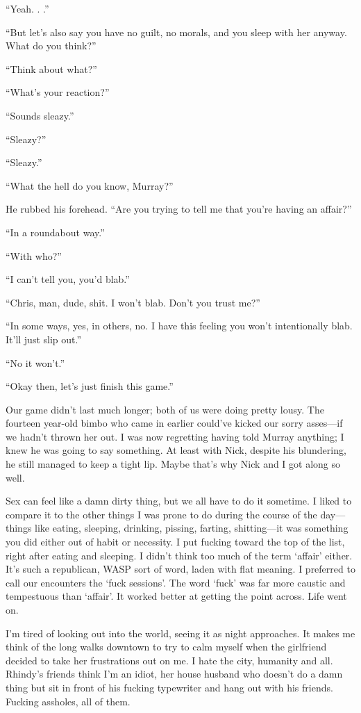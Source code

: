 ``Yeah. . .''

``But let's also say you have no guilt, no morals, and you sleep with
her anyway. What do you think?''

``Think about what?''

``What's your reaction?''

``Sounds sleazy.''

``Sleazy?''

``Sleazy.''

``What the hell do you know, Murray?''

He rubbed his forehead. ``Are you trying to tell me that you're having
an affair?''

``In a roundabout way.''

``With who?''

``I can't tell you, you'd blab.''

``Chris, man, dude, shit. I won't blab. Don't you trust me?''

``In some ways, yes, in others, no. I have this feeling you won't
intentionally blab. It'll just slip out.''

``No it won't.''

``Okay then, let's just finish this game.''

Our game didn't last much longer; both of us were doing pretty lousy.
The fourteen year-old bimbo who came in earlier could've kicked our
sorry asses---if we hadn't thrown her out. I was now regretting having
told Murray anything; I knew he was going to say something. At least
with Nick, despite his blundering, he still managed to keep a tight lip.
Maybe that's why Nick and I got along so well.

Sex can feel like a damn dirty thing, but we all have to do it sometime.
I liked to compare it to the other things I was prone to do during the
course of the day---things like eating, sleeping, drinking, pissing,
farting, shitting---it was something you did either out of habit or
necessity. I put fucking toward the top of the list, right after eating
and sleeping. I didn't think too much of the term `affair' either. It's
such a republican, WASP sort of word, laden with flat meaning. I
preferred to call our encounters the `fuck sessions'. The word `fuck'
was far more caustic and tempestuous than `affair'. It worked better at
getting the point across. Life went on.

I'm tired of looking out into the world, seeing it as night approaches.
It makes me think of the long walks downtown to try to calm myself when
the girlfriend decided to take her frustrations out on me. I hate the
city, humanity and all. Rhindy's friends think I'm an idiot, her house
husband who doesn't do a damn thing but sit in front of his fucking
typewriter and hang out with his friends. Fucking assholes, all of them.

